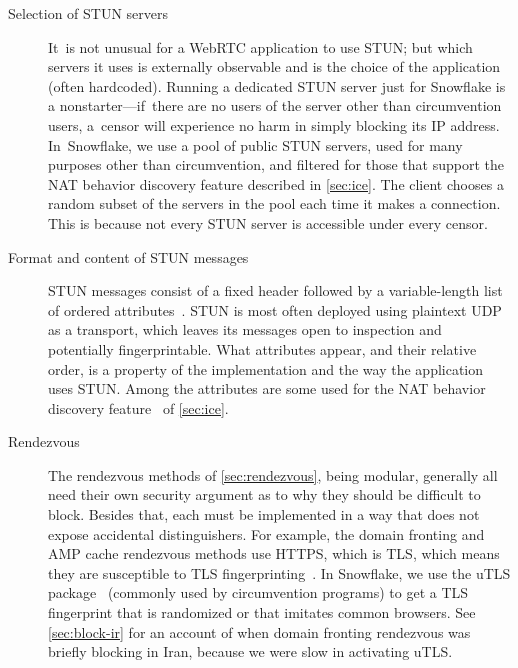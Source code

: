 \documentclass[letterpaper,twocolumn]{article}
\begin{document}
\begin{description}
\item[Selection of STUN servers]
It~is not unusual for a WebRTC application to use STUN;
but which servers it uses is externally observable
and is the choice of the application (often hardcoded).
Running a dedicated STUN server just for Snowflake is a nonstarter---if~there
are no users of the server other than circumvention users,
a~censor will experience no harm in simply blocking its IP address.
In~Snowflake, we use a pool of public STUN servers,
used for many purposes other than circumvention,
and filtered for those that support the NAT behavior discovery feature
described in \autoref{sec:ice}.
The client chooses a random subset of the servers in the pool
each time it makes a connection.
This is because not every STUN server is accessible
under every censor.

\item[Format and content of STUN messages]
STUN messages consist of a fixed header
followed by a variable-length list of ordered
attributes~\cite[\S 5]{rfc8489}.
STUN is most often deployed using plaintext UDP as a transport,
which leaves its messages open to inspection
and potentially fingerprintable.
What attributes appear,
and their relative order,
is a property of the implementation
and the way the application uses STUN.
Among the attributes are some used
for the NAT behavior discovery feature~\cite[\S 7]{rfc5780}
of \autoref{sec:ice}.


\item[Rendezvous]
The rendezvous methods of
\autoref{sec:rendezvous},
being modular,
generally all need their own security argument
as to why they should be difficult to block.
Besides that, each must be implemented in a way
that does not expose accidental distinguishers.
For example, the domain fronting and AMP cache rendezvous methods
use HTTPS, which is TLS, which means they are susceptible to TLS fingerprinting~\cite[\S 5.1]{Fifield2015a}.
In Snowflake, we use the uTLS package~\cite[\S VII]{Frolov2019a}
(commonly used by circumvention programs)
to get a TLS fingerprint that is randomized or that imitates common browsers.
See \autoref{sec:block-ir} for an account of when
domain fronting rendezvous was briefly blocking in Iran,
because we were slow in activating uTLS.


\end{description}
\end{document}
